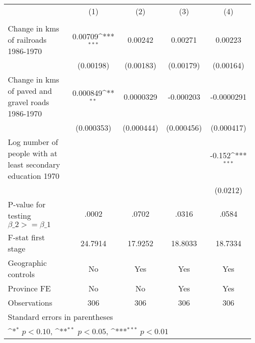 {
\def\sym#1{\ifmmode^{#1}\else\(^{#1}\)\fi}
\begin{tabular}{l*{4}{c}}
\hline\hline
                &\multicolumn{1}{c}{(1)}&\multicolumn{1}{c}{(2)}&\multicolumn{1}{c}{(3)}&\multicolumn{1}{c}{(4)}\\
                &\multicolumn{1}{c}{}&\multicolumn{1}{c}{}&\multicolumn{1}{c}{}&\multicolumn{1}{c}{}\\
\hline
Change in kms of railroads 1986-1970&  0.00709\sym{***}&  0.00242         &  0.00271         &  0.00223         \\
                &(0.00198)         &(0.00183)         &(0.00179)         &(0.00164)         \\
[1em]
Change in kms of paved and gravel roads 1986-1970& 0.000849\sym{**} &0.0000329         &-0.000203         &-0.0000291         \\
                &(0.000353)         &(0.000444)         &(0.000456)         &(0.000417)         \\
[1em]
Log number of people with at least secondary education 1970&                  &                  &                  &   -0.152\sym{***}\\
                &                  &                  &                  & (0.0212)         \\
\hline
P-value for testing $\beta\_{2} >= \beta\_{1}$&    .0002         &    .0702         &    .0316         &    .0584         \\
F-stat first stage&  24.7914         &  17.9252         &  18.8033         &  18.7334         \\
Geographic controls&       No         &      Yes         &      Yes         &      Yes         \\
Province FE     &       No         &       No         &      Yes         &      Yes         \\
Observations    &      306         &      306         &      306         &      306         \\
\hline\hline
\multicolumn{5}{l}{\footnotesize Standard errors in parentheses}\\
\multicolumn{5}{l}{\footnotesize \sym{*} \(p<0.10\), \sym{**} \(p<0.05\), \sym{***} \(p<0.01\)}\\
\end{tabular}
}
